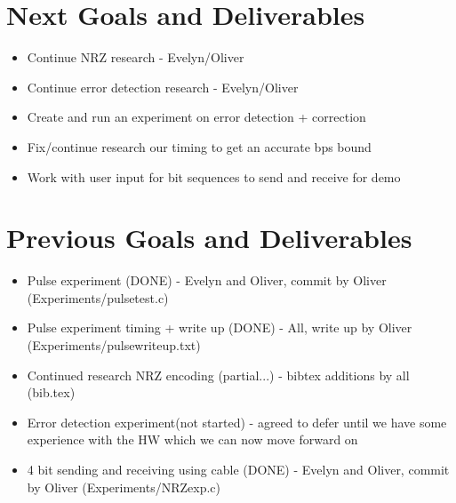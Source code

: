 \documentclass{article}
\begin{document}
\section*{Next Goals and Deliverables}
\begin{itemize}
\item Continue NRZ research - Evelyn/Oliver
\item Continue error detection research - Evelyn/Oliver
\item Create and run an experiment on error detection + correction
\item Fix/continue research our timing to get an accurate bps bound
\item Work with user input for bit sequences to send and receive for demo
\end{itemize}
\section*{Previous Goals and Deliverables}
\begin{itemize}
\item Pulse experiment (DONE) - Evelyn and Oliver, commit by Oliver (Experiments/pulsetest.c)
\item Pulse experiment timing + write up (DONE) - All, write up by Oliver (Experiments/pulsewriteup.txt)
\item Continued research NRZ encoding (partial...) - bibtex additions by all (bib.tex)
\item Error detection experiment(not started) - agreed to defer until we have some experience with the HW which we can now move forward on
\item 4 bit sending and receiving using cable (DONE) - Evelyn and Oliver, commit by Oliver (Experiments/NRZexp.c)
\end{itemize}
\end{document}
